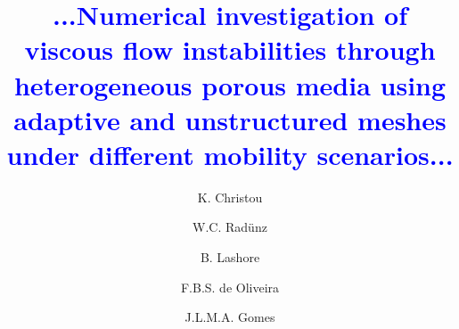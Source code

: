 \documentclass[preprint,authoryear,12pt]{elsarticle}
\newcommand{\blue}{\textcolor{blue}}
\begin{document}
\begin{frontmatter}



\title{ \blue{...Numerical investigation of viscous flow instabilities through heterogeneous porous media using adaptive and unstructured meshes under different mobility scenarios...}}

\author[UoA]{K. Christou} \author[UoA,UFRGS]{W.C. Rad\"unz}  \author[UoA]{B. Lashore} \author[UESC]{F.B.S. de Oliveira}
\author[UoA]{J.L.M.A. Gomes}

\address[UoA]{Environmental and Industrial Fluid Mechanics Group, School of Engineering, University of Aberdeen, UK}
\address[UFRGS]{Engineering School, Federal University of Rio Grande do Sul, Brazil}
\address[UESC]{Department of Exact and Technological Sciences, State University of Santa Cruz, Bahia, Brazil}


\end{frontmatter}
\end{document}
